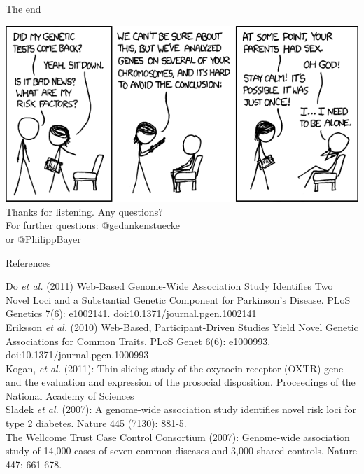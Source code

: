 \documentclass[12pt,a4paper]{beamer}
\begin{document}
\begin{frame}{The end}
\begin{center}
\includegraphics[scale=0.5]{genetic_analysis.png} \\
Thanks for listening. Any questions?\\
For further questions: @gedankenstuecke\\
or @PhilippBayer
\end{center}
\end{frame}


\begin{frame}{References}
\begin{tiny}
Do \textit{et al.} (2011) Web-Based Genome-Wide Association Study Identifies Two Novel Loci and a Substantial Genetic Component for Parkinson's Disease. PLoS Genetics 7(6): e1002141. doi:10.1371/journal.pgen.1002141 \\
Eriksson \textit{et al.} (2010) Web-Based, Participant-Driven Studies Yield Novel Genetic Associations for Common Traits. PLoS Genet 6(6): e1000993. doi:10.1371/journal.pgen.1000993\\
Kogan, \textit{et al.} (2011): Thin-slicing study of the oxytocin receptor (OXTR) gene and the evaluation and expression of the prosocial disposition. Proceedings of the National Academy of Sciences\\
Sladek \textit{et al.} (2007): A genome-wide association study identifies novel risk loci for type 2 diabetes. Nature 445 (7130): 881-5. \\
The Wellcome Trust Case Control Consortium  (2007): Genome-wide association study of 14,000 cases of seven common diseases and 3,000 shared controls. Nature 447: 661-678.\\
\end{tiny}
\end{frame}
\end{document}
